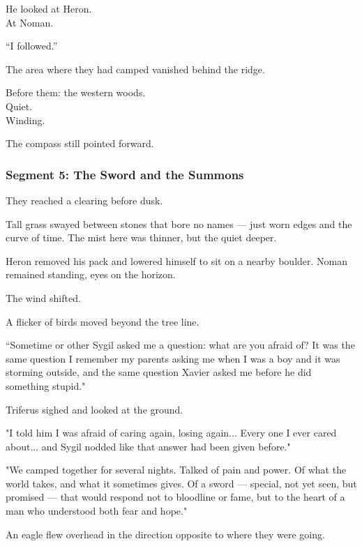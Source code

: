 \documentclass[9pt]{article}
\begin{document}
He looked at Heron.\\
At Noman.

“I followed.”

\vspace{1em}

The area where they had camped vanished behind the ridge.

Before them: the western woods.\\
Quiet.\\
Winding.

The compass still pointed forward.

\newpage

\subsubsection*{Segment 5: The Sword and the Summons}

They reached a clearing before dusk.

Tall grass swayed between stones that bore no names — just worn edges and the curve of time. The mist here was thinner, but the quiet deeper.

Heron removed his pack and lowered himself to sit on a nearby boulder. Noman remained standing, eyes on the horizon.

The wind shifted.

A flicker of birds moved beyond the tree line.

\vspace{1em}

“Sometime or other Sygil asked me a question: what are you afraid of? It was the same question I remember my parents asking me when I was a boy and it was storming outside, and the same question Xavier asked me before he did something stupid."

Triferus sighed and looked at the ground.

"I told him I was afraid of caring again, losing again... Every one I ever cared about... and Sygil nodded like that answer had been given before."

\vspace{1em}

"We camped together for several nights. Talked of pain and power. Of what the world takes, and what it sometimes gives. Of a sword — special, not yet seen, but promised — that would respond not to bloodline or fame, but to the heart of a man who understood both fear and hope."

An eagle flew overhead in the direction opposite to where they were going.
\end{document}
